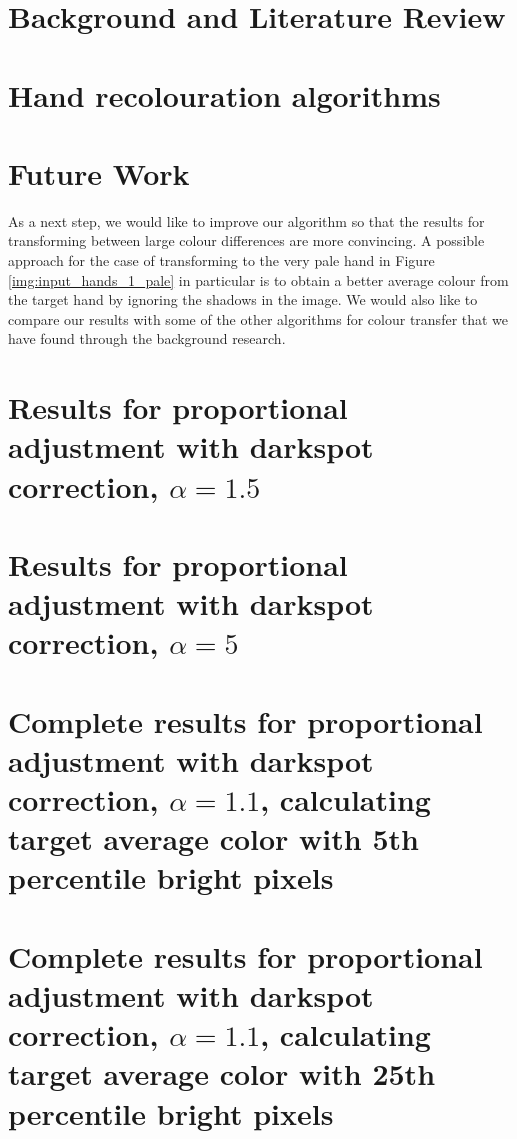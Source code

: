 \documentclass[12pt, a4paper]{article}
\begin{document}
\section{Background and Literature Review}

\pagebreak

\section{Hand recolouration algorithms}

\pagebreak

\section{Future Work}
As a next step, we would like to improve our algorithm so that the results for transforming between large colour differences are more convincing. A possible approach for the case of transforming to the very pale hand in Figure \ref{img:input_hands_1_pale} in particular is to obtain a better average colour from the target hand by ignoring the shadows in the image. We would also like to compare our results with some of the other algorithms for colour transfer that we have found through the background research.
\pagebreak



\pagebreak

\appendix
\section{Results for proportional adjustment with darkspot correction, $\alpha = 1.5$}\label{app:prop_corr_ave_a1p5}


\section{Results for proportional adjustment with darkspot correction, $\alpha = 5$}\label{app:prop_corr_ave_a5}


\section{Complete results for proportional adjustment with darkspot correction, $\alpha = 1.1$, calculating target average color with 5th percentile bright pixels}\label{app:prop_corr_ave_a1p1_perc5}


\section{Complete results for proportional adjustment with darkspot correction, $\alpha = 1.1$, calculating target average color with 25th percentile bright pixels}\label{app:prop_corr_ave_a1p1_perc25}

\end{document}
